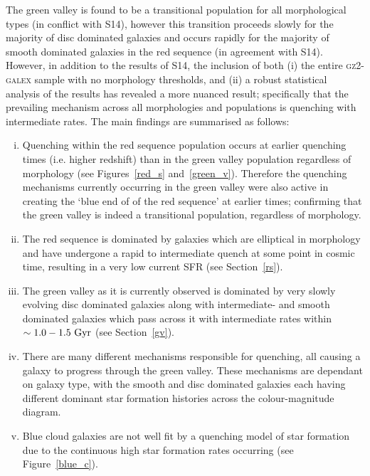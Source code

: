 The green valley is found to be a transitional population for all morphological types (in conflict with S14), however this transition proceeds slowly for the majority of disc dominated galaxies and occurs rapidly for the majority of smooth dominated galaxies in the red sequence (in agreement with S14). However, in addition to the results of S14, the inclusion of both (i) the entire \textsc{gz2-galex} sample with no morphology thresholds, and (ii) a robust statistical analysis of the results has revealed a more nuanced result; specifically that the prevailing mechanism across all morphologies and populations is quenching with intermediate rates. The main findings are summarised as follows:
\begin{enumerate}[(i)]
\item Quenching within the red sequence population occurs at earlier quenching times (i.e. higher redshift) than in the green valley population regardless of morphology (see Figures~\ref{red_s} and~\ref{green_v}). Therefore the quenching mechanisms currently occurring in the green valley were also active in creating the `blue end of of the red sequence' at earlier times; confirming that the green valley is indeed a transitional population, regardless of morphology.

\item The red sequence is dominated by galaxies which are elliptical in morphology and have undergone a rapid to intermediate quench at some point in cosmic time, resulting in a very low current SFR (see Section~\ref{rs}).

\item The green valley as it is currently observed is dominated by very slowly evolving disc dominated galaxies along with intermediate- and smooth dominated galaxies which pass across it with intermediate rates within $\sim 1.0-1.5~\rm{Gyr}$ (see Section~\ref{gv}).

\item There are many different mechanisms responsible for quenching, all causing a galaxy to progress through the green valley. These mechanisms are dependant on galaxy type, with the smooth and disc dominated galaxies each having different dominant star formation histories across the colour-magnitude diagram. 

\item Blue cloud galaxies are not well fit by a quenching model of star formation due to the continuous high star formation rates occurring (see Figure~\ref{blue_c}).


\end{enumerate}
